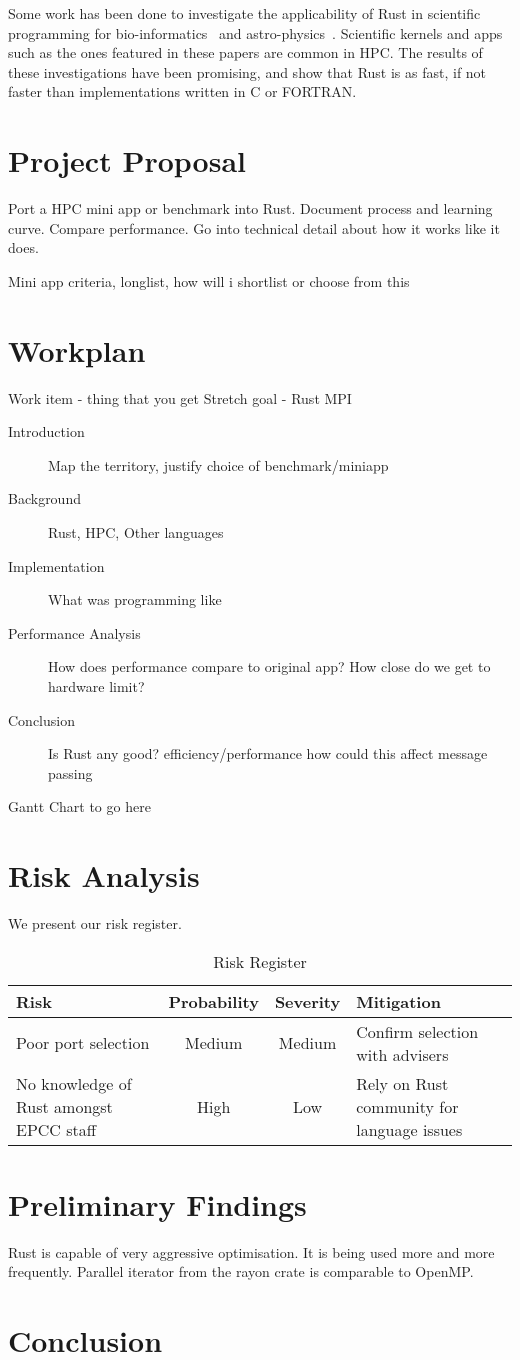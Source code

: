 \documentclass{article}[a4]
\begin{document}
Some work has been done to investigate the applicability of Rust in scientific programming for bio-informatics~\cite{bioinformatics} and astro-physics~\cite{blanco-cuaresma_bolmont_2016}. Scientific kernels and apps such as the ones featured in these papers are common in HPC. The results of these investigations have been promising, and show that Rust is as fast, if not faster than implementations written in C or FORTRAN.

\section{Project Proposal} %
Port a HPC mini app or benchmark into Rust. Document process and learning curve. Compare performance. Go into technical detail about how it works like it does.

Mini app criteria, longlist, how will i shortlist or choose from this
\section{Workplan} %

Work item - thing that you get
Stretch goal - Rust MPI
\begin{description}
  \item[Introduction] Map the territory, justify choice of benchmark/miniapp
  \item[Background] Rust, HPC, Other languages
  \item[Implementation] What was programming like
  \item[Performance Analysis] How does performance compare to original app? How close do we get to hardware limit?
  \item[Conclusion] Is Rust any good? efficiency/performance how could this affect message passing
\end{description}

Gantt Chart to go here

\section{Risk Analysis}
We present our risk register.
\begin{table}[h]
  \centering
  \begin{tabular}{p{4cm} c c p{4cm}}
    Risk & Probability & Severity & Mitigation \\
    \hline
    Poor port selection & Medium & Medium & Confirm selection with advisers \\ \hline
    No knowledge of Rust amongst EPCC staff & High & Low & Rely on Rust community for language issues \\
  \end{tabular}
  \caption{Risk Register}
  \label{tab:risk}
\end{table}
\section{Preliminary Findings}
Rust is capable of very aggressive optimisation. It is being used more and more frequently. Parallel iterator from the rayon crate is comparable to OpenMP.
\section{Conclusion}
\pagebreak


\end{document}
